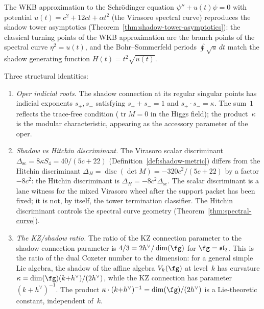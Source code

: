 \begin{remark}
\label{rem:hitchin-wkb}
The WKB approximation to the Schr\"odinger equation
$\psi'' + u(t)\psi = 0$ with potential
$u(t) = c^2 + 12ct + \alpha t^2$ (the Virasoro spectral
curve) reproduces the shadow tower asymptotics
(Theorem~\ref{thm:shadow-tower-asymptotics}):
the classical turning points of the WKB approximation
are the branch points of the spectral curve
$\eta^2 = u(t)$, and the Bohr--Sommerfeld periods
$\oint \sqrt{u}\,dt$ match the shadow generating function
$H(t) = t^2\sqrt{u(t)}$.

Three structural identities:
\begin{enumerate}[label=\textup{(\roman*)}]
\item \emph{Oper indicial roots.} The shadow connection
 at its regular singular points has indicial exponents
 $s_+, s_-$ satisfying
 $s_+ + s_- = 1$ and $s_+ \cdot s_- = \kappa$.
 The sum~$1$ reflects the trace-free condition
 ($\operatorname{tr} M = 0$ in the Higgs field); the
 product~$\kappa$ is the modular characteristic, appearing
 as the accessory parameter of the oper.
\item \emph{Shadow vs Hitchin discriminant.}
 The Virasoro scalar discriminant
 $\Delta_{\mathrm{sc}} = 8\kappa S_4 = 40/(5c{+}22)$
 (Definition~\ref{def:shadow-metric}) differs from the
 Hitchin discriminant
 $\Delta_H = \operatorname{disc}(\det M)
 = -320c^2/(5c{+}22)$
 by a factor $-8c^2$: the Hitchin discriminant is
 $\Delta_H = -8c^2\Delta_{\mathrm{sc}}$. The scalar
 discriminant is a lane witness for the mixed Virasoro wheel after
 the support packet has been fixed; it is not, by itself, the tower
 termination classifier. The Hitchin discriminant controls the
 spectral curve geometry
 (Theorem~\ref{thm:spectral-curve}).
\item \emph{The KZ/shadow ratio.}
 The ratio of the KZ connection parameter to the shadow
 connection parameter is $4/3 = 2h^\vee/\dim(\fg)$
 for $\fg = \mathfrak{sl}_2$. This is the ratio of
 the dual Coxeter number to the dimension: for a
 general simple Lie algebra, the shadow of the affine
 algebra $V_k(\fg)$ at level~$k$ has curvature
 $\kappa = \dim(\fg)(k{+}h^\vee)/(2h^\vee)$, while
 the KZ connection has parameter
 $(k{+}h^\vee)^{-1}$. The product
 $\kappa \cdot (k{+}h^\vee)^{-1}
 = \dim(\fg)/(2h^\vee)$
 is a Lie-theoretic constant, independent of~$k$.
\end{enumerate}
\end{remark}

